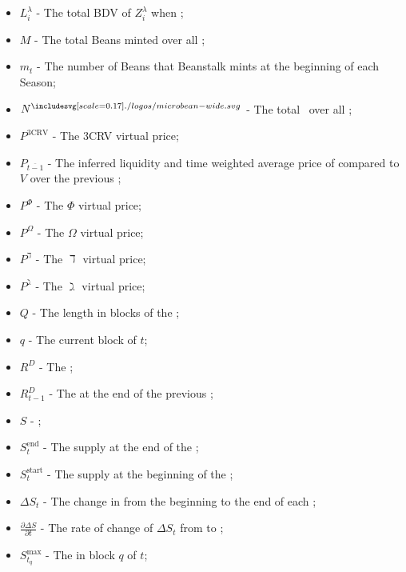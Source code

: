 \documentclass[class=article, crop=false]{standalone}
\begin{document}
\begin{itemize}[topsep=0pt, itemsep=3pt,leftmargin=16pt]
    \item[] $L_i^{\lambda}$ - \hypertarget{ht123}{The total BDV of $Z_i^{\lambda}$ when };
    \item[] $M$ - \hypertarget{ht128}{The total Beans minted over all };
    \item[] $m_t$ - The number of Beans that Beanstalk mints at the beginning of each Season;
    \item[] $N^{\bean}$ - \hypertarget{ht132}{The total  \Bean\ over all };
    \item[] $P^{\text{3CRV}}$ - \hypertarget{ht136}{The 3CRV virtual price};
    \item[] $P_{\overline{t-1}}$ - \hypertarget{ht139}{The inferred liquidity and time weighted average price of  compared to $V$ over the previous };
    \item[] $P^{\Phi}$ - \hypertarget{ht140}{The $\Phi$ virtual price};
    \item[] $P^{\Omega}$ - \hypertarget{ht141}{The $\Omega$ virtual price};
    \item[] $P^{\daleth}$ - \hypertarget{ht137}{The $\daleth$ virtual price};
    \item[] $P^{\gimel}$ - \hypertarget{ht138}{The $\gimel$ virtual price};
    \item[] $Q$ - The length in blocks of the ;
    \item[] $q$ - The current block of $t$;
    \item[] $R^D$ - \hypertarget{ht156}{The };
    \item[] $R^D_{t-1}$ - \hypertarget{ht157}{The  at the end of the previous };
    \item[] $S$ - \hypertarget{ht170}{};
    \item[] $S_t^{\text{end}}$ - \hypertarget{ht171}{The  supply at the end of the };
    \item[] $S_t^{\text{start}}$ - \hypertarget{ht173}{The  supply at the beginning of the };
    \item[] $\Delta S_t$ - \hypertarget{ht60}{The change in  from the beginning to the end of each };
    \item[] $\frac{\partial \Delta S}{\partial t}$ - \hypertarget{ht63}{The rate of change of $\Delta S_t$ from  to };
    \item[] $S_{t_q}^{\text{max}}$ - The  in block $q$ of $t$;

\end{itemize}
\end{document}
